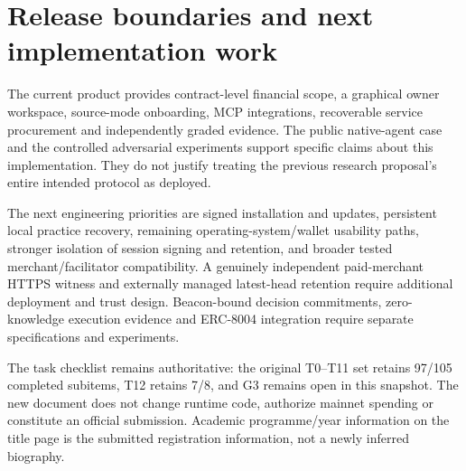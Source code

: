 \section{Release boundaries and next implementation work}\label{sec:conclusion}
The current product provides contract-level financial scope, a graphical owner workspace, source-mode onboarding, MCP integrations, recoverable service procurement and independently graded evidence. The public native-agent case and the controlled adversarial experiments support specific claims about this implementation. They do not justify treating the previous research proposal's entire intended protocol as deployed.

The next engineering priorities are signed installation and updates, persistent local practice recovery, remaining operating-system/wallet usability paths, stronger isolation of session signing and retention, and broader tested merchant/facilitator compatibility. A genuinely independent paid-merchant HTTPS witness and externally managed latest-head retention require additional deployment and trust design. Beacon-bound decision commitments, zero-knowledge execution evidence and ERC-8004 integration require separate specifications and experiments.

The task checklist remains authoritative: the original T0--T11 set retains 97/105 completed subitems, T12 retains 7/8, and G3 remains open in this snapshot. The new document does not change runtime code, authorize mainnet spending or constitute an official submission. Academic programme/year information on the title page is the submitted registration information, not a newly inferred biography.
